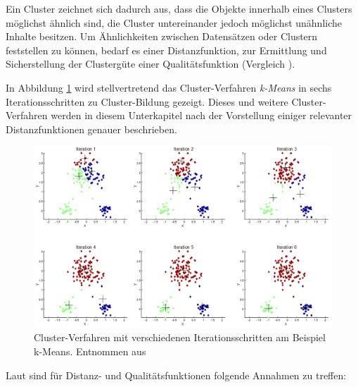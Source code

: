Ein Cluster zeichnet sich dadurch aus, dass die Objekte innerhalb eines Clusters möglichst ähnlich sind, die Cluster untereinander jedoch möglichst unähnliche Inhalte besitzen. Um Ähnlichkeiten zwischen Datensätzen oder Clustern feststellen zu können, bedarf es einer Distanzfunktion, zur Ermittlung und Sicherstellung der Clustergüte einer Qualitätsfunktion (Vergleich ). 

In Abbildung \ref{fig:clusterverf} wird stellvertretend das Cluster-Verfahren \textit{k-Means} in sechs Iterationsschritten zu Cluster-Bildung gezeigt. Dieses und weitere Cluster-Verfahren werden in diesem Unterkapitel nach der Vorstellung einiger relevanter Distanzfunktionen genauer beschrieben. 

\begin{figure}[htb!]
\centering
\includegraphics[width=1.0\textwidth]{bilder/kmeansclustering.jpg}
\caption{Cluster-Verfahren mit verschiedenen Iterationsschritten am Beispiel k-Means. Entnommen aus \protect{}}
\label{fig:clusterverf}
\end{figure}    

\newpage

Laut  sind für Distanz- und Qualitätsfunktionen folgende Annahmen zu treffen:  


